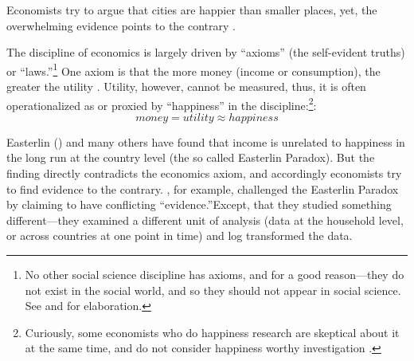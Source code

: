 \documentclass[10pt, letterpaper]{article}
\begin{document}
%

Economists try to argue that cities are happier than smaller places, yet, the
overwhelming evidence points to the contrary
\citep{gurin60,campbell76etal,aok11a,aok_brfss_city_cize16,senior_ny_sep16_14,ons11,ibt13,morrison15,lenzi16D,morrison11,aok20}. 
%

The discipline of economics is largely driven by ``axioms'' (the self-evident truths)
or ``laws.''\footnote{No other social science discipline has axioms, and for a good
reason---they do not exist in the social world, and so they should not appear in
social science. See \citet{feynman81} and \cite{davies18} for elaboration.} 
One axiom is that the more money (income or consumption), the greater the
utility \citep[e.g.,][]{autor10}. Utility, however, cannot be measured, thus, it
is often operationalized as or proxied by  ``happiness'' in the discipline:\footnote{Curiously, some economists who do happiness research are skeptical about it at the same time, and do not consider happiness worthy investigation
  \citep[e.g.,][]{deaton13c,glaeser14B,glaeser14}.}:
\begin{equation}
money = utility \approx happiness
\end{equation}%

Easterlin (\citeyear{easterlin15B,easterlin10B}) and many others have found that
income is unrelated to happiness in the long run at the country level (the so
called Easterlin Paradox). But the finding directly contradicts the economics
axiom, and accordingly economists try to find evidence to the contrary. \citet{stevenson13}, for example, challenged the Easterlin Paradox by claiming to have conflicting ``evidence.''Except, that they studied something different---they examined a different unit of analysis (data at the household level, or across countries at one point in time) and log transformed the data. 
\end{document}

